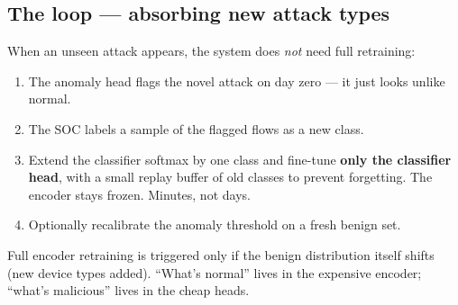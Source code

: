 \documentclass[11pt,a4paper]{article}
\begin{document}
\subsection{The loop --- absorbing new attack types}
When an unseen attack appears, the system does \emph{not} need full retraining:
\begin{enumerate}[leftmargin=*, itemsep=2pt]
  \item The anomaly head flags the novel attack on day zero --- it just looks unlike normal.
  \item The SOC labels a sample of the flagged flows as a new class.
  \item Extend the classifier softmax by one class and fine-tune \textbf{only the classifier head}, with a small replay buffer of old classes to prevent forgetting. The encoder stays frozen. Minutes, not days.
  \item Optionally recalibrate the anomaly threshold on a fresh benign set.
\end{enumerate}
Full encoder retraining is triggered only if the benign distribution itself shifts (new device types added). ``What's normal'' lives in the expensive encoder; ``what's malicious'' lives in the cheap heads.
\end{document}

